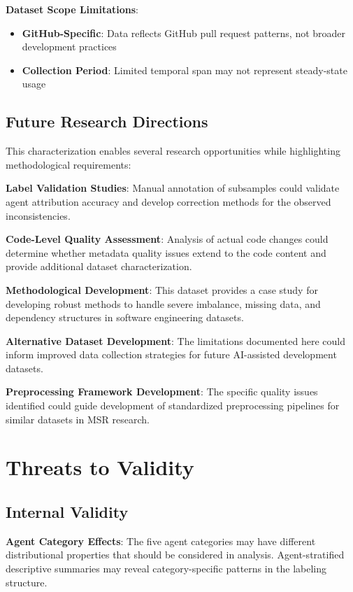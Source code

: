 \documentclass[conference]{IEEEtran}
\begin{document}
\textbf{Dataset Scope Limitations}:
\begin{itemize}
    \item \textbf{GitHub-Specific}: Data reflects GitHub pull request patterns, not broader development practices
    \item \textbf{Collection Period}: Limited temporal span may not represent steady-state usage

\end{itemize}

\subsection{Future Research Directions}

This characterization enables several research opportunities while highlighting methodological requirements:

\textbf{Label Validation Studies}: Manual annotation of subsamples could validate agent attribution accuracy and develop correction methods for the observed inconsistencies.

\textbf{Code-Level Quality Assessment}: Analysis of actual code changes could determine whether metadata quality issues extend to the code content and provide additional dataset characterization.

\textbf{Methodological Development}: This dataset provides a case study for developing robust methods to handle severe imbalance, missing data, and dependency structures in software engineering datasets.

\textbf{Alternative Dataset Development}: The limitations documented here could inform improved data collection strategies for future AI-assisted development datasets.

\textbf{Preprocessing Framework Development}: The specific quality issues identified could guide development of standardized preprocessing pipelines for similar datasets in MSR research.

\section{Threats to Validity}

\subsection{Internal Validity}

\textbf{Agent Category Effects}: The five agent categories may have different distributional properties that should be considered in analysis. Agent-stratified descriptive summaries may reveal category-specific patterns in the labeling structure.
\end{document}
